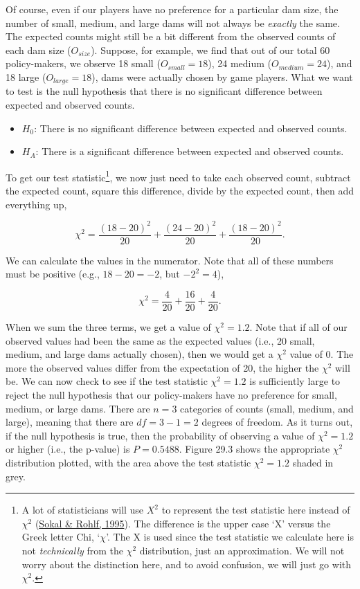 \documentclass[
  openany]{krantz}
\providecommand{\tightlist}{%
  \setlength{\itemsep}{0pt}\setlength{\parskip}{0pt}}
\begin{document}
Of course, even if our players have no preference for a particular dam size, the number of small, medium, and large dams will not always be \emph{exactly} the same.
The expected counts might still be a bit different from the observed counts of each dam size (\(O_{size}\)).
Suppose, for example, we find that out of our total 60 policy-makers, we observe 18 small (\(O_{small} = 18\)), 24 medium (\(O_{medium} = 24\)), and 18 large (\(O_{large} = 18\)), dams were actually chosen by game players.
What we want to test is the null hypothesis that there is no significant difference between expected and observed counts.

\begin{itemize}
\tightlist
\item
  \(H_{0}\): There is no significant difference between expected and observed counts.
\item
  \(H_{A}\): There is a significant difference between expected and observed counts.
\end{itemize}

To get our test statistic\footnote{A lot of statisticians will use \(X^{2}\) to represent the test statistic here instead of \(\chi^{2}\) (\protect\hyperlink{ref-Sokal1995}{Sokal \& Rohlf, 1995}). The difference is the upper case `X' versus the Greek letter Chi, `\(\chi\)'. The X is used since the test statistic we calculate here is not \emph{technically} from the \(\chi^{2}\) distribution, just an approximation. We will not worry about the distinction here, and to avoid confusion, we will just go with \(\chi^{2}\).}, we now just need to take each observed count, subtract the expected count, square this difference, divide by the expected count, then add everything up,

\[\chi^{2} = \frac{(18 - 20)^{2}}{20} + \frac{(24 - 20)^{2}}{20} + \frac{(18 - 20)^{2}}{20}.\]

We can calculate the values in the numerator.
Note that all of these numbers must be positive (e.g., \(18 - 20 = -2\), but \(-2^{2} = 4\)),

\[\chi^{2} = \frac{4}{20} + \frac{16}{20} + \frac{4}{20}.\]

When we sum the three terms, we get a value of \(\chi^{2} = 1.2\).
Note that if all of our observed values had been the same as the expected values (i.e., 20 small, medium, and large dams actually chosen), then we would get a \(\chi^{2}\) value of 0.
The more the observed values differ from the expectation of 20, the higher the \(\chi^{2}\) will be.
We can now check to see if the test statistic \(\chi^{2} = 1.2\) is sufficiently large to reject the null hypothesis that our policy-makers have no preference for small, medium, or large dams.
There are \(n = 3\) categories of counts (small, medium, and large), meaning that there are \(df = 3 - 1 = 2\) degrees of freedom.
As it turns out, if the null hypothesis is true, then the probability of observing a value of \(\chi^{2} = 1.2\) or higher (i.e., the p-value) is \(P = 0.5488\).
Figure 29.3 shows the appropriate \(\chi^{2}\) distribution plotted, with the area above the test statistic \(\chi^{2} = 1.2\) shaded in grey.
\end{document}
